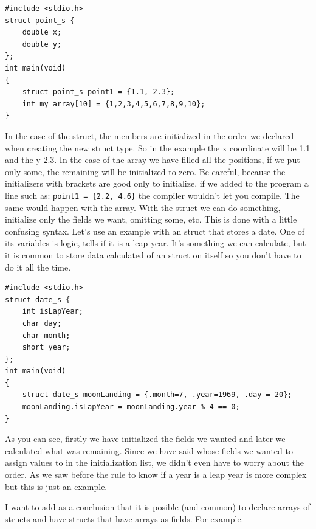 \documentclass[a4paper]{article}
\begin{document}
\noindent
\begin{minipage}[H]{\linewidth}
\mbox{}
\begin{lstlisting}[style=C,
caption={Initializing with brackets},
label={lst:initializationLists}]
#include <stdio.h>
struct point_s {
    double x;
    double y;
};
int main(void)
{
    struct point_s point1 = {1.1, 2.3};
    int my_array[10] = {1,2,3,4,5,6,7,8,9,10};
}
\end{lstlisting}
\end{minipage}

In the case of the struct, the members are initialized in the order we declared
when creating the new struct type. So in the example the x coordinate will be
1.1 and the y 2.3. In the case of the array we have filled all the
positions, if we put only some, the remaining will be initialized to zero.
Be careful, because the initializers with brackets are good only to initialize,
if we added to the program a line such as:
\lstinline[style=C]!point1 = {2.2, 4.6}! the
compiler wouldn't let you compile. The same would happen with the array. With
the struct we can do something, initialize only the fields we want, omitting
some, etc. This is done with a little confusing syntax. Let's use an example
with an struct that stores a date. One of its variables is logic, tells if it
is a leap year. It's something we can calculate, but it is common to
store data calculated of an struct on itself so you don't have to do it
all the time.

\noindent
\begin{minipage}[H]{\linewidth}
\mbox{}
\begin{lstlisting}[style=C,
caption={Initializing a struct with brackets and field selection},
label={lst:dateStruct}]
#include <stdio.h>
struct date_s {
    int isLapYear;
    char day;
    char month;
    short year;
};
int main(void)
{
    struct date_s moonLanding = {.month=7, .year=1969, .day = 20};
    moonLanding.isLapYear = moonLanding.year % 4 == 0;
}
\end{lstlisting}
\end{minipage}

As you can see, firstly we have initialized the fields we wanted and later we
calculated what was remaining. Since we have said whose fields we wanted to
assign values to in the initialization list, we didn't even have to worry about
the order. As we saw before the rule to know if a year is a leap year is more
complex but this is just an example.

I want to add as a conclusion that it is posible (and common) to declare arrays
of structs and have structs that have arrays as fields. For example.
\end{document}
